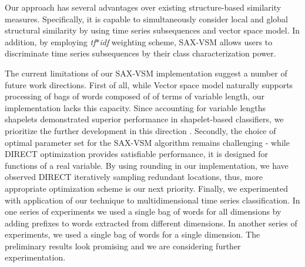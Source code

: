 \documentclass{llncs}
\begin{document}
Our approach has several advantages over existing structure-based similarity measures.
Specifically, it is capable to simultaneously consider local and global structural similarity by 
using time series subsequences and vector space model. In addition, by employing
\textit{tf$\ast$idf} weighting scheme, SAX-VSM allows users to discriminate time series
subsequences by their class characterization power.

The current limitations of our SAX-VSM implementation suggest a number of future work directions. 
First of all, while Vector space model naturally supports processing of bags of words composed of
of terms of variable length, our implementation lacks this capacity. Since accounting for variable 
lengths shapelets demonstrated superior performance \cite{bagnal} in shapelet-based classifiers,
we prioritize the further development in this direction
. Secondly, the choice of optimal parameter set for the SAX-VSM algorithm remains challenging - 
while DIRECT optimization provides satisfiable performance, it is designed for functions of a real 
variable. By using rounding in our implementation, we have observed DIRECT iteratively sampling 
redundant locations, thus, more appropriate optimization scheme is our next priority. 
Finally, we experimented with application of our technique to multidimensional time 
series classification. 
In one series of experiments we used a single bag of words for all dimensions by adding 
prefixes to words extracted from different dimensions. 
In another series of experiments, we used a single bag of words for a single dimension. 
The preliminary results look promising and we are considering further experimentation.
\end{document}
